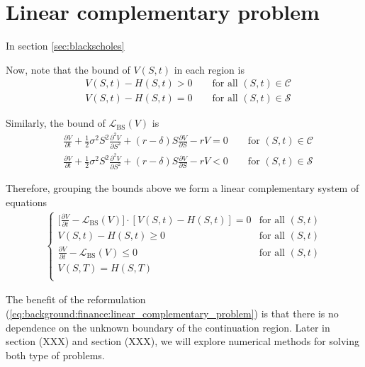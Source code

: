 \section{Linear complementary problem}

In section \ref{sec:blackscholes}

Now, note that the bound of $V(S, t)$ in each region is
\begin{align*}
  &V(S, t) - H(S, t) > 0 \qquad \text{for all $(S,t) \in \mathcal{C}$} \\ 
  &V(S, t) - H(S, t) = 0 \qquad \text{for all $(S,t) \in \mathcal{S}$}
\end{align*}

Similarly, the bound of $\mathcal{L}_{\text{BS}}(V)$ is
\begin{align*}
  &\frac{\partial{V}}{\partial{t}} + \frac{1}{2}\sigma^{2} S^2 \frac{\partial^2{V}}{\partial{S^2}} + (r - \delta)S \frac{\partial{V}}{\partial{S}} - rV = 0 \qquad \text{for $(S,t) \in \mathcal{C}$} \\
  &\frac{\partial{V}}{\partial{t}} + \frac{1}{2}\sigma^{2} S^2 \frac{\partial^2{V}}{\partial{S^2}} + (r - \delta)S \frac{\partial{V}}{\partial{S}} - rV < 0 \qquad \text{for $(S,t) \in \mathcal{S}$}
\end{align*}

Therefore, grouping the bounds above we form a linear complementary system of equations
{
  \color{red}  
  \begin{align}
    \begin{cases}
      \big[\frac{\partial V}{\partial t} - \mathcal{L}_{\text{BS}}(V)\big] \cdot [V(S,t) - H(S,t)] = 0 & \text{for all $(S,t)$} \\
      V(S, t) - H(S, t) \ge 0 & \text{for all $(S, t)$}\\
      \frac{\partial V}{\partial t} - \mathcal{L}_{\text{BS}}(V) \le 0 &  \text{for all $(S, t)$}\\
      V(S, T) = H(S, T) \\  
    \end{cases}
    \label{eq:background:finance:linear_complementary_problem}
  \end{align}
}

The benefit of the reformulation (\ref*{eq:background:finance:linear_complementary_problem})
is that there is no dependence on the unknown boundary of the continuation region.
Later in section (XXX) and section (XXX), we will explore numerical methods for solving 
both type of problems.



